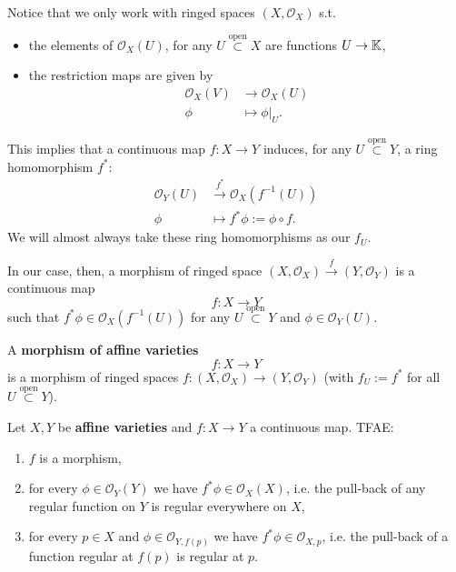 \begin{rem}
	Notice that we only work with ringed spaces $\left( X, \mathcal{O}_{ X } \right)$ s.t.
	\begin{itemize}
		\item the elements of $\mathcal{O}_X(U)$, for any $U \stackrel{\text{open}}{\subset} X$ are functions $U \to\mathbb{K}$,
		\item the restriction maps are given by
			\begin{align}
				\mathcal{O}_X(V) &\to \mathcal{O}_X(U) \\
				\phi &\mapsto \left.\phi\right|_{U} 
			.\end{align} 
	\end{itemize}
	This implies that a continuous map $f: X \to Y$ induces, for any $U \stackrel{\text{open}}{\subset} Y$, a ring homomorphism $f^*$:
	\begin{align}
		\mathcal{O}_Y(U) &\xrightarrow{f^*} \mathcal{O}_X \left( f^{-1}(U) \right) \\
		\phi &\mapsto f^*\phi := \phi \circ f
	.\end{align} 
	We will almost always take these ring homomorphisms as our $f_U$.
\end{rem}

\begin{rem}
	In our case, then, a morphism of ringed space $\left( X, \mathcal{O}_{ X } \right) \xrightarrow{f} \left( Y, \mathcal{O}_{ Y } \right)$ is a continuous map 
	\begin{equation}
	f: X \to Y
	\end{equation} 
	such that $f^*\phi \in \mathcal{O}_X \left( f^{-1}(U) \right)$ for any $U \stackrel{\text{open}}{\subset} Y$ and $\phi \in \mathcal{O}_Y(U)$.
\end{rem}

\begin{defn}
	A \textbf{morphism of affine varieties}
	\begin{equation}
	f: X \to Y
	\end{equation} 
	is a morphism of ringed spaces $f: \left( X, \mathcal{O}_{ X } \right) \to \left( Y, \mathcal{O}_{ Y } \right)$ (with $f_U := f^*$ for all $U \stackrel{\text{open}}{\subset} Y$).
\end{defn}

\begin{lem}
	Let $X, Y$ be \textbf{affine varieties} and $f: X \to Y$ a continuous map. TFAE:
	\begin{enumerate}
		\item $f$ is a morphism,
		\item for every $\phi \in \mathcal{O}_Y(Y)$ we have $f^*\phi \in \mathcal{O}_{X}(X)$, i.e. the pull-back of any regular function on $Y$ is regular everywhere on $X$,
		\item for every $p \in X$ and $\phi \in \mathcal{O}_{Y, f(p)}$ we have $f^*\phi \in \mathcal{O}_{X,p}$, i.e. the pull-back of a function regular at $f(p)$ is regular at $p$.
	\end{enumerate}
\end{lem} 

